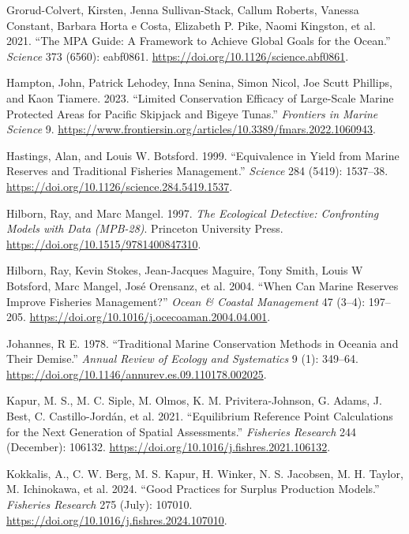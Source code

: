 \documentclass[
  default,
  lineno,
  referee]{sn-jnl}
\newlength{\cslhangindent}
\newenvironment{CSLReferences}[2] %
 {\begin{list}{}{%
  \setlength{\itemindent}{0pt}
  \setlength{\leftmargin}{0pt}
  \setlength{\parsep}{0pt}
  \ifodd #1
   \setlength{\leftmargin}{\cslhangindent}
   \setlength{\itemindent}{-1\cslhangindent}
  \fi
  \setlength{\itemsep}{#2\baselineskip}}}
 {\end{list}}
\begin{document}
\begin{CSLReferences}{1}{0}
Grorud-Colvert, Kirsten, Jenna Sullivan-Stack, Callum Roberts, Vanessa
Constant, Barbara Horta e Costa, Elizabeth P. Pike, Naomi Kingston, et
al. 2021. {``The MPA Guide: A Framework to Achieve Global Goals for the
Ocean.''} \emph{Science} 373 (6560): eabf0861.
\url{https://doi.org/10.1126/science.abf0861}.

Hampton, John, Patrick Lehodey, Inna Senina, Simon Nicol, Joe Scutt
Phillips, and Kaon Tiamere. 2023. {``Limited Conservation Efficacy of
Large-Scale Marine Protected Areas for Pacific Skipjack and Bigeye
Tunas.''} \emph{Frontiers in Marine Science} 9.
\url{https://www.frontiersin.org/articles/10.3389/fmars.2022.1060943}.

Hastings, Alan, and Louis W. Botsford. 1999. {``Equivalence in Yield
from Marine Reserves and Traditional Fisheries Management.''}
\emph{Science} 284 (5419): 1537--38.
\url{https://doi.org/10.1126/science.284.5419.1537}.

Hilborn, Ray, and Marc Mangel. 1997. \emph{The Ecological Detective:
Confronting Models with Data (MPB-28)}. Princeton University Press.
\url{https://doi.org/10.1515/9781400847310}.

Hilborn, Ray, Kevin Stokes, Jean-Jacques Maguire, Tony Smith, Louis W
Botsford, Marc Mangel, José Orensanz, et al. 2004. {``When Can Marine
Reserves Improve Fisheries Management?''} \emph{Ocean \& Coastal
Management} 47 (3--4): 197--205.
\url{https://doi.org/10.1016/j.ocecoaman.2004.04.001}.

Johannes, R E. 1978. {``Traditional Marine Conservation Methods in
Oceania and Their Demise.''} \emph{Annual Review of Ecology and
Systematics} 9 (1): 349--64.
\url{https://doi.org/10.1146/annurev.es.09.110178.002025}.

Kapur, M. S., M. C. Siple, M. Olmos, K. M. Privitera-Johnson, G. Adams,
J. Best, C. Castillo-Jordán, et al. 2021. {``Equilibrium Reference Point
Calculations for the Next Generation of Spatial Assessments.''}
\emph{Fisheries Research} 244 (December): 106132.
\url{https://doi.org/10.1016/j.fishres.2021.106132}.

Kokkalis, A., C. W. Berg, M. S. Kapur, H. Winker, N. S. Jacobsen, M. H.
Taylor, M. Ichinokawa, et al. 2024. {``Good Practices for Surplus
Production Models.''} \emph{Fisheries Research} 275 (July): 107010.
\url{https://doi.org/10.1016/j.fishres.2024.107010}.


\end{CSLReferences}
\end{document}
